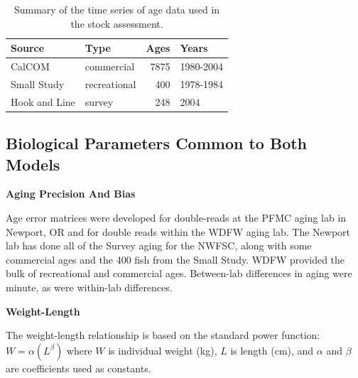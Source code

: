 \documentclass[12pt,]{article}
\begin{document}
\begin{table}[ht]
\centering
\caption{Summary of the
                                              time series of age data used in the stock
                                              assessment.} 
\label{tab:Age_sources}
\begin{tabular}{llrl}
  \hline
Source & Type & Ages & Years \\ 
  \hline
CalCOM & commercial & 7875 & 1980-2004 \\ 
  Small Study & recreational & 400 & 1978-1984 \\ 
  Hook and Line & survey & 248 & 2004 \\ 
   \hline
\end{tabular}
\end{table}

\subsection{Biological Parameters Common to Both
Models}\label{biological-parameters-common-to-both-models}

\vspace{.5cm}

\textbf{Aging Precision And Bias}

Age error matrices were developed for double-reads at the PFMC aging lab
in Newport, OR and for double reads within the WDFW aging lab. The
Newport lab has done all of the Survey aging for the NWFSC, along with
some commercial ages and the 400 fish from the Small Study. WDFW
provided the bulk of recreational and commercial ages. Between-lab
differences in aging were minute, as were within-lab differences.

\vspace{.5cm}

\textbf{Weight-Length}

The weight-length relationship is based on the standard power function:
\(W = \alpha(L^\beta)\) where \(W\) is individual weight (kg), \(L\) is
length (cm), and \(\alpha\) and \(\beta\) are coefficients used as
constants.
\end{document}
